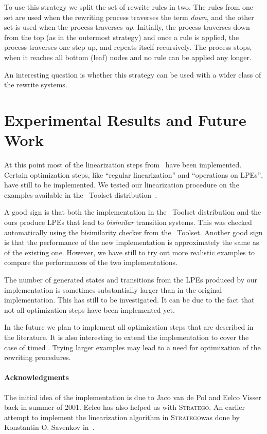 \documentclass[fleqn]{llncs}
\newcommand{\stratego}{\textsc{Stratego}}
\begin{document}
To use this strategy we split the set of rewrite rules in two. The
rules from one set are used when the rewriting process traverses the
term \emph{down}, and the other set is used when the process traverses
\emph{up}. Initially, the process traverses down from the top (as in
the outermost strategy) and once a rule is applied, the process
traverses one step up, and repeats itself recursively. The process
stops, when it reaches all bottom (leaf) nodes and no rule can be
applied any longer.

An interesting question is whether this strategy can be used with a
wider class of the rewrite systems.

\section{Experimental Results and Future Work}
At this point most of the linearization steps from~\cite{Use02} have
been implemented. Certain optimization steps, like ``regular
linearization'' and ``operations on LPEs'', have still to be
implemented. We tested our linearization procedure on the examples
available in the \mcrl\ Toolset distribution~\cite{Wou01}.

A good sign is that both the implementation in the \mcrl\ Toolset
distribution and the ours produce LPEs that lead to \emph{bisimilar}
transition systems. This was checked automatically using the
bisimilarity checker from the \mcrl\ Toolset. Another good sign is
that the performance of the new implementation is approximately the
same as of the existing one. However, we have still to try out more
realistic examples to compare the performances of the two
implementations.

The number of generated states and transitions from the LPEs produced
by our implementation is sometimes substantially larger than in the
original implementation. This has still to be investigated.  It can be
due to the fact that not all optimization steps have been implemented
yet.

In the future we plan to implement all optimization steps that are
described in the literature. It is also interesting to extend the
implementation to cover the case of timed \mcrl.  Trying larger
examples may lead to a need for optimization of the rewriting
procedures.

\paragraph{Acknowledgments}
The initial idea of the implementation is due to Jaco van de Pol and
Eelco Visser back in summer of 2001. Eelco has also helped us with
\stratego. An earlier attempt to implement the linearization algorithm
in \stratego was done by Konstantin O.  Savenkov in~\cite{Sav02}.



\end{document}
